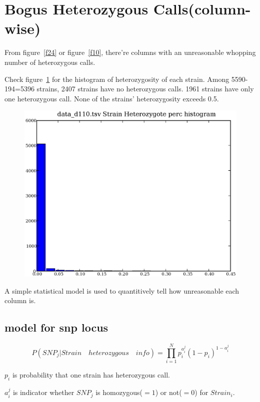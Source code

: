 \documentclass[a4paper,10pt]{article}
\begin{document}
\section{Bogus Heterozygous Calls(column-wise)}
From figure~\ref{f24} or figure~\ref{f10}, there're columns with an unreasonable whopping number of heterozygous calls.

Check figure~\ref{f2} for the histogram of heterozygosity of each strain. Among 5590-194=5396 strains, 2407 strains have no heterozygous calls. 1961 strains have only one heterozygous call. None of the strains' heterozygosity exceeds 0.5.

\begin{figure}
\includegraphics[width=1\textwidth]{figures/data_d110_strain_hz_perc.eps}
\caption{}\label{f2}
\end{figure}

A simple statistical model is used to quantitively tell how unreasonable each column is.

\subsection{model for snp locus}
\begin{equation}
P({SNP}_j|Strain\quad heterozygous\quad info) = \prod_{i=1}^{N} p_i^{a_i^j} (1-p_i)^{1-a_i^j}
\end{equation}

$p_i$ is probability that one strain has heterozygous call.

$a_i^j$ is indicator whether ${SNP}_j$ is homozygous($=1$) or not($=0$) for ${Strain}_i$.
\end{document}
